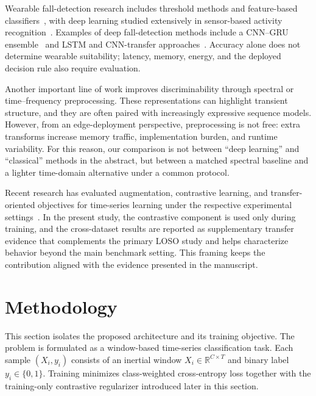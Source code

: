 \documentclass[jec]{acnsart}
\begin{document}
Wearable fall-detection research includes threshold methods and feature-based classifiers~\cite{mubashir2013survey}, with deep learning studied extensively in sensor-based activity recognition~\cite{wang2019deep}. Examples of deep fall-detection methods include a CNN--GRU ensemble~\cite{Liu2023FallEnsemble} and LSTM and CNN-transfer approaches~\cite{Butt2022FallLSTM}. Accuracy alone does not determine wearable suitability; latency, memory, energy, and the deployed decision rule also require evaluation.

Another important line of work improves discriminability through spectral or time--frequency preprocessing. These representations can highlight transient structure, and they are often paired with increasingly expressive sequence models. However, from an edge-deployment perspective, preprocessing is not free: extra transforms increase memory traffic, implementation burden, and runtime variability. For this reason, our comparison is not between ``deep learning'' and ``classical'' methods in the abstract, but between a matched spectral baseline and a lighter time-domain alternative under a common protocol.

Recent research has evaluated augmentation, contrastive learning, and transfer-oriented objectives for time-series learning under the respective experimental settings~\cite{Eldele2021TSTCC,Iwana2021DataAugmentation,Jia2024TransferLearningHAR,Wu2024DomainAdaptationContrastive}. In the present study, the contrastive component is used only during training, and the cross-dataset results are reported as supplementary transfer evidence that complements the primary LOSO study and helps characterize behavior beyond the main benchmark setting. This framing keeps the contribution aligned with the evidence presented in the manuscript.

\section{Methodology}

This section isolates the proposed architecture and its training objective. The problem is formulated as a window-based time-series classification task. Each sample $(X_i, y_i)$ consists of an inertial window $X_i \in \mathbb{R}^{C \times T}$ and binary label $y_i \in \{0,1\}$. Training minimizes class-weighted cross-entropy loss together with the training-only contrastive regularizer introduced later in this section.

\FloatBarrier
\end{document}
